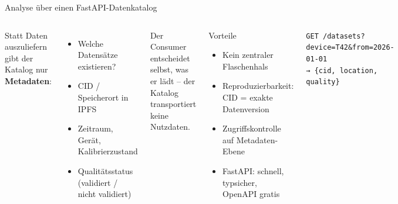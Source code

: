 \documentclass[aspectratio=169]{beamer}
\begin{document}
\begin{frame}{Analyse über einen FastAPI-Datenkatalog}
  \begin{columns}
      Statt Daten auszuliefern gibt der Katalog nur \textbf{Metadaten}:
      \begin{itemize}
        \item Welche Datensätze existieren?
        \item CID / Speicherort in IPFS
        \item Zeitraum, Gerät, Kalibrierzustand
        \item Qualitätsstatus (validiert / nicht validiert)
      \end{itemize}
      \vspace{0.5em}
      Der Consumer entscheidet selbst, was er lädt –
      der Katalog transportiert keine Nutzdaten.
      \begin{block}{Vorteile}
        \begin{itemize}
          \item Kein zentraler Flaschenhals
          \item Reproduzierbarkeit: CID = exakte Datenversion
          \item Zugriffskontrolle auf Metadaten-Ebene
          \item FastAPI: schnell, typsicher, OpenAPI gratis
        \end{itemize}
      \end{block}
      \begin{exampleblock}{}
        \texttt{GET /datasets?device=T42\&from=2026-01-01}\\
        \texttt{→ \{cid, location, quality\}}
      \end{exampleblock}
  \end{columns}
\end{frame}
\end{document}
